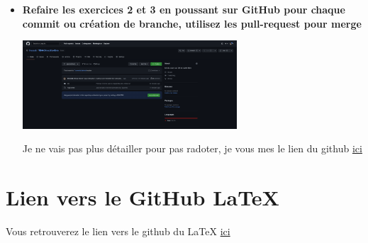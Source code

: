 \documentclass[12pt]{article}
\begin{document}
\begin{itemize}
  \item \textbf{Refaire les exercices 2 et 3 en poussant sur GitHub pour chaque commit ou création de branche,
  utilisez les pull-request pour merge}
  \vspace{0.3cm}

  \includegraphics[width=8cm]{images/screen-git-td4-4.png}
  \vspace{0.3cm}

  Je ne vais pas plus détailler pour pas radoter, je vous mes le lien du github \href{https://github.com/theoesb/TD4-Git-outils-libre.git}{ici}
\end{itemize}
\vspace{0.3cm}

  \section{Lien vers le GitHub LaTeX}
  \vspace{0.3cm}

  Vous retrouverez le lien vers le github du LaTeX \href{https://github.com/theoesb/synth-td-outils-libres.git}{ici}
\end{document}
